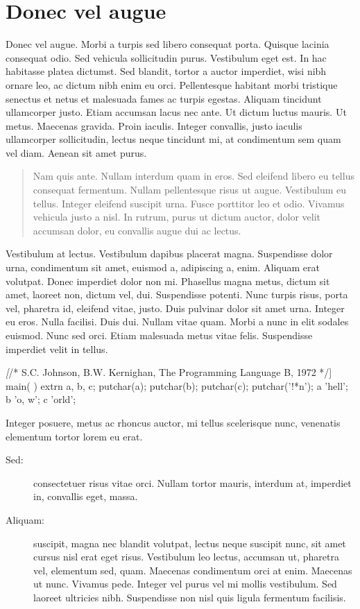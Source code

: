 \documentclass[cfonts]{nostarch}
\begin{document}
\section{Donec vel augue}


Donec vel augue. Morbi a turpis sed libero consequat porta. Quisque
lacinia consequat odio. Sed vehicula sollicitudin purus. Vestibulum
eget est. In hac habitasse platea dictumst. Sed blandit, tortor a
auctor imperdiet, wisi nibh ornare leo, ac dictum nibh enim eu orci.
Pellentesque habitant morbi tristique senectus et netus et malesuada
fames ac turpis egestas.  Aliquam tincidunt ullamcorper justo. Etiam
accumsan lacus nec ante.  Ut dictum luctus mauris. Ut metus. Maecenas
gravida. Proin iaculis.  Integer convallis, justo iaculis ullamcorper
sollicitudin, lectus neque tincidunt mi, at condimentum sem quam vel
diam. Aenean sit amet purus.
\begin{quote}
  Nam quis ante. Nullam interdum quam in eros.  Sed eleifend libero eu
  tellus consequat fermentum. Nullam pellentesque risus ut augue.
  Vestibulum eu tellus. Integer eleifend suscipit urna. Fusce
  porttitor leo et odio. Vivamus vehicula justo a nisl. In rutrum,
  purus ut dictum auctor, dolor velit accumsan dolor, eu convallis
  augue dui ac lectus. 
\end{quote}

Vestibulum at lectus. Vestibulum dapibus placerat magna. Suspendisse
dolor urna, condimentum sit amet, euismod a, adipiscing a, enim.
Aliquam erat volutpat. Donec imperdiet dolor non mi. Phasellus magna
metus, dictum sit amet, laoreet non, dictum vel, dui. Suspendisse
potenti. Nunc turpis risus, porta vel, pharetra id, eleifend vitae,
justo. Duis pulvinar dolor sit amet urna. Integer eu eros. Nulla
facilisi. Duis dui.  Nullam vitae quam. Morbi a nunc in elit sodales
euismod. Nunc sed orci. Etiam malesuada metus vitae felis. Suspendisse
imperdiet velit in tellus.
\begin{quotation}
\lipsum[40-41]  
\end{quotation}
\lipsum[63-65]
\begin{Code}[commandchars=\\\[\]]
\textit[/* S.C. Johnson, B.W. Kernighan, The Programming Language B, 1972 */]
main( ) {
   extrn a, b, c;
   putchar(a); putchar(b); putchar(c); putchar('!*n');
 }
 a 'hell';
 b 'o, w';
 c 'orld';  
\end{Code}


Integer posuere, metus ac rhoncus auctor, mi tellus scelerisque nunc,
venenatis elementum tortor lorem eu erat.  
\begin{description}
\item[Sed:] consectetuer risus
vitae orci. Nullam tortor mauris, interdum at, imperdiet in, convallis
eget, massa. 
\item[Aliquam:] suscipit, magna nec blandit volutpat, lectus
neque suscipit nunc, sit amet cursus nisl erat eget risus. Vestibulum
leo lectus, accumsan ut, pharetra vel, elementum sed, quam. Maecenas
condimentum orci at enim. Maecenas ut nunc. Vivamus pede. Integer vel
purus vel mi mollis vestibulum. Sed laoreet ultricies nibh.
Suspendisse non nisl quis ligula fermentum facilisis. 
\end{description}
\lipsum[37]
\end{document}
